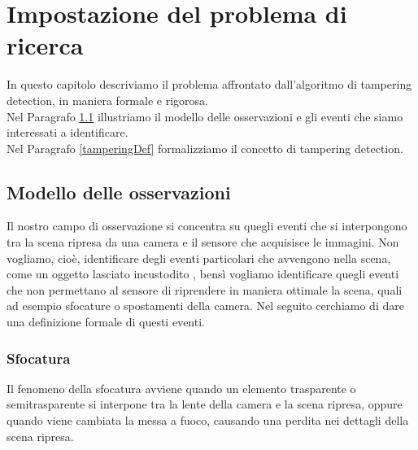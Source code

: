 \chapter{Impostazione del problema di ricerca}
\label{FormulazioneProblema}
\thispagestyle{empty}

\vspace{0.5cm}
In questo capitolo descriviamo il problema affrontato dall'algoritmo di tampering detection, in maniera formale e rigorosa. \\
Nel Paragrafo \ref{modelloOsservaz} illustriamo il modello delle osservazioni e gli eventi che siamo interessati a identificare.\\
Nel Paragrafo \ref{tamperingDef} formalizziamo il concetto di tampering detection. 
\noindent 
\section{Modello delle osservazioni}
\label{modelloOsservaz}
Il nostro campo di osservazione si concentra su quegli eventi che si interpongono tra la scena ripresa da una camera e il sensore che acquisisce le immagini. Non vogliamo, cio\`e, identificare degli eventi particolari che avvengono nella scena, come un oggetto lasciato incustodito \cite{Targhe}, bens\`i vogliamo identificare quegli eventi che non permettano al sensore di riprendere in maniera ottimale la scena, quali ad esempio sfocature o spostamenti della camera.
Nel seguito cerchiamo di dare una definizione formale di questi eventi.
\subsection{Sfocatura}
\label{sfocatura}
Il fenomeno della sfocatura avviene quando un elemento trasparente o semitrasparente si interpone tra la lente della camera e la \gls{scena} ripresa, oppure quando viene cambiata la messa a fuoco, causando una perdita nei dettagli della \gls{scena} ripresa.

